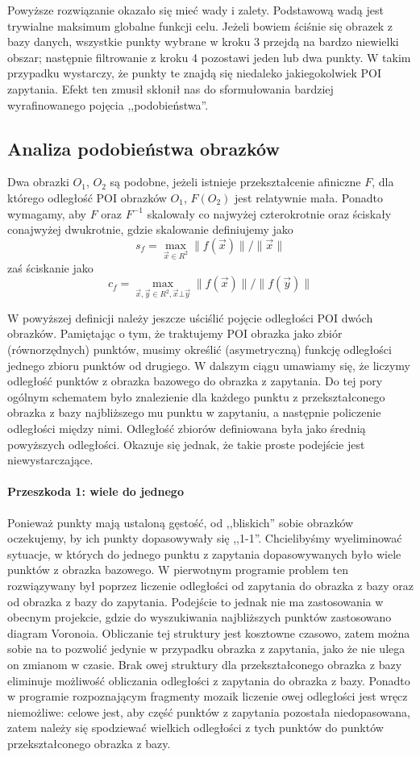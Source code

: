 \documentclass[a4paper,12pt,leqno]{article}
\begin{document}
Powyższe rozwiązanie okazało się mieć wady i zalety. Podstawową wadą jest trywialne maksimum globalne funkcji celu. Jeżeli bowiem ściśnie się obrazek z bazy danych, wszystkie punkty wybrane
w kroku 3 przejdą na bardzo niewielki obszar; następnie filtrowanie z kroku 4 pozostawi jeden lub dwa punkty. W takim przypadku wystarczy, że punkty te znajdą się niedaleko jakiegokolwiek
POI zapytania. Efekt ten zmusił skłonił nas do sformułowania bardziej wyrafinowanego pojęcia ,,podobieństwa''. 

\subsection{Analiza podobieństwa obrazków}
Dwa obrazki $O_1$, $O_2$ są podobne, jeżeli istnieje przekształcenie afiniczne $F$, dla którego odległość POI obrazków $O_1$, $F(O_2)$ jest relatywnie mała.
Ponadto wymagamy, aby $F$ oraz $F^{-1}$ skalowały co najwyżej czterokrotnie oraz ściskały conajwyżej dwukrotnie, gdzie skalowanie definiujemy jako
\[ s_f = \max_{\vec x \in R^2} \| f(\vec x) \| / \| \vec x \| \]
zaś ściskanie jako
\[ c_f = \max_{\vec x, \vec y \in R^2, \vec x \bot \vec y} \| f(\vec x) \| / \| f(\vec y) \| \]

W powyższej definicji należy jeszcze uściślić pojęcie odległości POI dwóch obrazków. Pamiętając o tym, że traktujemy POI obrazka jako zbiór (równorzędnych) punktów, 
musimy określić (asymetryczną) funkcję odległości jednego zbioru punktów od drugiego. W dalszym ciągu umawiamy się, że liczymy odległość punktów z obrazka bazowego do obrazka z zapytania.
Do tej pory ogólnym schematem było znalezienie dla każdego punktu z przekształconego obrazka z bazy najbliższego mu punktu w zapytaniu, a następnie policzenie odległości między nimi.
Odległość zbiorów definiowana była jako średnią powyższych odległości. Okazuje się jednak, że takie proste podejście jest niewystarczające.

\paragraph{Przeszkoda 1: wiele do jednego}
Ponieważ punkty mają ustaloną gęstość, od ,,bliskich'' sobie obrazków oczekujemy, by ich punkty dopasowywały się ,,1-1''. 
Chcielibyśmy wyeliminować sytuacje, w których do jednego punktu z zapytania dopasowywanych było wiele punktów z obrazka bazowego.
W pierwotnym programie problem ten rozwiązywany był poprzez liczenie odległości od zapytania do obrazka z bazy oraz od obrazka z bazy do zapytania.
Podejście to jednak nie ma zastosowania w obecnym projekcie, gdzie do wyszukiwania najbliższych punktów zastosowano diagram Voronoia. Obliczanie tej struktury
jest kosztowne czasowo, zatem można sobie na to pozwolić jedynie w przypadku obrazka z zapytania, jako że nie ulega on zmianom w czasie. Brak owej struktury dla
przekształconego obrazka z bazy eliminuje możliwość obliczania odległości z zapytania do obrazka z bazy. Ponadto w programie rozpoznającym fragmenty mozaik liczenie
owej odległości jest wręcz niemożliwe: celowe jest, aby część punktów z zapytania pozostała niedopasowana, zatem należy się spodziewać wielkich odległości z tych
punktów do punktów przekształconego obrazka z bazy.
\end{document}
